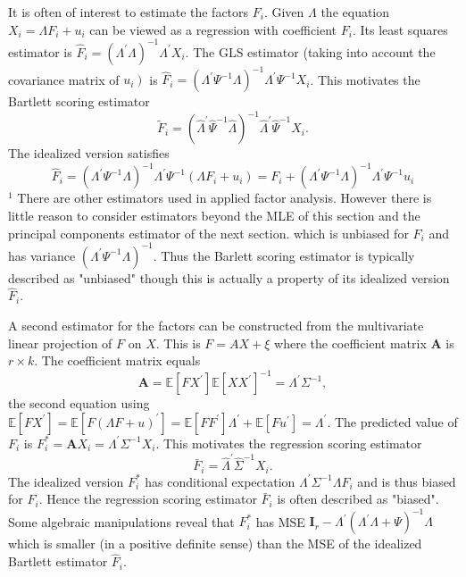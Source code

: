 \documentclass[10pt]{article}
\begin{document}
It is often of interest to estimate the factors $F_{i}$. Given $\Lambda$ the equation $X_{i}=\Lambda F_{i}+u_{i}$ can be viewed as a regression with coefficient $F_{i}$. Its least squares estimator is $\widehat{F}_{i}=\left(\Lambda^{\prime} \Lambda\right)^{-1} \Lambda^{\prime} X_{i}$. The GLS estimator (taking into account the covariance matrix of $\left.u_{i}\right)$ is $\widehat{F}_{i}=\left(\Lambda^{\prime} \Psi^{-1} \Lambda\right)^{-1} \Lambda^{\prime} \Psi^{-1} X_{i}$. This motivates the Bartlett scoring estimator
$$
\widetilde{F}_{i}=\left(\widehat{\Lambda}^{\prime} \widehat{\Psi}^{-1} \widehat{\Lambda}\right)^{-1} \widehat{\Lambda}^{\prime} \widehat{\Psi}^{-1} X_{i} .
$$
The idealized version satisfies
$$
\widehat{F}_{i}=\left(\Lambda^{\prime} \Psi^{-1} \Lambda\right)^{-1} \Lambda^{\prime} \Psi^{-1}\left(\Lambda F_{i}+u_{i}\right)=F_{i}+\left(\Lambda^{\prime} \Psi^{-1} \Lambda\right)^{-1} \Lambda^{\prime} \Psi^{-1} u_{i}
$$
${ }^{1}$ There are other estimators used in applied factor analysis. However there is little reason to consider estimators beyond the MLE of this section and the principal components estimator of the next section. which is unbiased for $F_{i}$ and has variance $\left(\Lambda^{\prime} \Psi^{-1} \Lambda\right)^{-1}$. Thus the Barlett scoring estimator is typically described as "unbiased" though this is actually a property of its idealized version $\widehat{F}_{i}$.

A second estimator for the factors can be constructed from the multivariate linear projection of $F$ on $X$. This is $F=A X+\xi$ where the coefficient matrix $\boldsymbol{A}$ is $r \times k$. The coefficient matrix equals
$$
\boldsymbol{A}=\mathbb{E}\left[F X^{\prime}\right] \mathbb{E}\left[X X^{\prime}\right]^{-1}=\Lambda^{\prime} \Sigma^{-1},
$$
the second equation using $\mathbb{E}\left[F X^{\prime}\right]=\mathbb{E}\left[F(\Lambda F+u)^{\prime}\right]=\mathbb{E}\left[F F^{\prime}\right] \Lambda^{\prime}+\mathbb{E}\left[F u^{\prime}\right]=\Lambda^{\prime}$. The predicted value of $F_{i}$ is $F_{i}^{*}=\boldsymbol{A} X_{i}=\Lambda^{\prime} \Sigma^{-1} X_{i}$. This motivates the regression scoring estimator
$$
\bar{F}_{i}=\widehat{\Lambda}^{\prime} \widehat{\Sigma}^{-1} X_{i} .
$$
The idealized version $F_{i}^{*}$ has conditional expectation $\Lambda^{\prime} \Sigma^{-1} \Lambda F_{i}$ and is thus biased for $F_{i}$. Hence the regression scoring estimator $\bar{F}_{i}$ is often described as "biased". Some algebraic manipulations reveal that $F_{i}^{*}$ has MSE $\boldsymbol{I}_{r}-\Lambda^{\prime}\left(\Lambda^{\prime} \Lambda+\Psi\right)^{-1} \Lambda$ which is smaller (in a positive definite sense) than the MSE of the idealized Bartlett estimator $\widehat{F}_{i}$.
\end{document}
